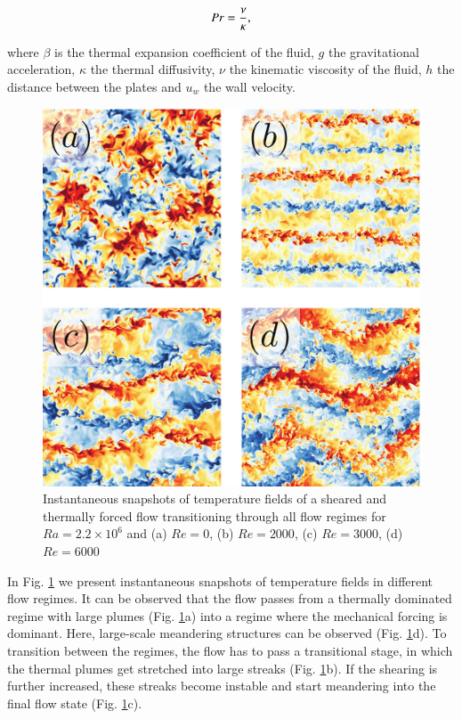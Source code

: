 \documentclass[final,5p,times,twocolumn]{elsarticle}
\begin{document}
\begin{equation} %
Pr= \frac{\nu}{\kappa},
\label{eqn:Pr} \\[8pt]
\end{equation}


where $ \beta $ is the thermal expansion coefficient of the fluid, $ g $ the
gravitational acceleration, $ \kappa $ the thermal diffusivity, $ \nu $ the
kinematic viscosity of the fluid, $ h $ the distance between the plates and
$ u_w $ the wall velocity.

\begin{figure}
	\centering
	\includegraphics[width=\linewidth]{squaredoverview}%
	\caption{\label{fig:overview} Instantaneous snapshots of temperature fields
of a sheared and thermally forced flow transitioning through all flow regimes
for $ Ra=2.2 \times 10^6 $ and (a) $ Re=0 $, (b) $ Re=2000 $, (c) $ Re=3000 $, (d) $ Re=6000 $}
\end{figure}

In Fig. \ref{fig:overview} we present instantaneous snapshots of temperature
fields in different flow regimes. It can be observed that the flow passes from a
thermally dominated regime with large plumes (Fig. \ref{fig:overview}a) into a
regime where the mechanical forcing is dominant. Here, large-scale meandering
structures can be observed (Fig. \ref{fig:overview}d). To transition between the
regimes, the flow has to pass a transitional stage, in which the thermal plumes
get stretched into large streaks (Fig. \ref{fig:overview}b). If the shearing is
further increased, these streaks become instable and start meandering into the
final flow state (Fig. \ref{fig:overview}c).
\end{document}
